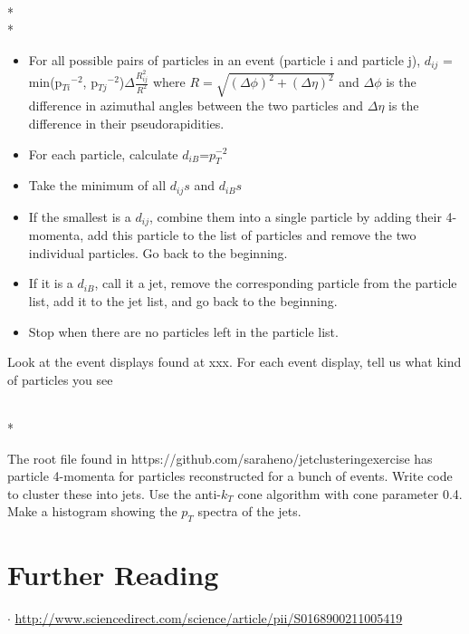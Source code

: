 \\*
\\*
\begin{itemize}
\item For all possible pairs of particles in an event (particle i and particle j), $d_{ij}$ = min(p$_{Ti}$$^{-2}$, p$_{Tj}$$^{-2}$)$\Delta\frac{R_{ij}^{2}}{R^{2}}$ where $R=\sqrt{(\Delta\phi)^{2}+(\Delta\eta)^{2}}$ and $\Delta\phi$ is the difference in azimuthal angles between the two particles and $\Delta\eta$ is the difference in their pseudorapidities.
\item For each particle, calculate $d_{iB}$=$p_{T}^{-2}$
\item Take the minimum of all $d_{ij}s$ and $d_{iB}s$
\item If the smallest is a $d_{ij}$, combine them into a single particle by adding their 4-momenta, add this particle to the list of particles and remove the two individual particles.  Go back to the beginning.
\item If it is a $d_{iB}$, call it a jet, remove the corresponding particle from the particle list, add it to the jet list, and go back to the beginning.
\item Stop when there are no particles left in the particle list.
\end{itemize}
\newpage
\noindent
\vspace{.2cm} 
\begin{minipage}{0.7\textwidth} 
\begin{framed}
\begin{exercise}
{Look at the event displays found at xxx. For each event display, tell us what kind of particles you see}
\end{exercise}
\end{framed} 
\end{minipage}
\vspace{.2cm}
\\*
\vspace{.2cm} 
\begin{minipage}{0.7\textwidth} 
\begin{framed}
\begin{exercise}
{The root file found in https://github.com/saraheno/jetclusteringexercise  has particle 4-momenta for particles reconstructed for a bunch of events. Write code to cluster these into jets. Use the anti-$k_{T}$ cone algorithm with cone parameter 0.4. Make a histogram showing the $p_{T}$ spectra of the jets.}
\end{exercise}
\end{framed} 
\end{minipage}
\vspace{.2cm}

\section{Further Reading}
\noindent
$\cdot$ \url{http://www.sciencedirect.com/science/article/pii/S0168900211005419}

